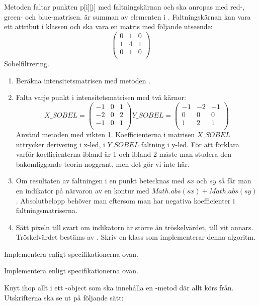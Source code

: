 Metoden faltar punkten p[i][j] med faltningskärnan  och ska anropas med red-, green- och blue-matrisen.  är summan av elementen i . Faltningskärnan kan vara ett attribut i klassen och ska vara en matris med följande utseende:
$$
\begin{pmatrix}
  0 & 1 & 0 \\
  1 & 4 & 1 \\
  0 & 1 & 0 \\
\end{pmatrix}
$$
\Task Sobelfiltrering.
\begin{enumerate} 
	\item Beräkna intensitetsmatrisen med metoden .
	\item Falta varje punkt i intensitetsmatrisen med två kärnor:
$$
X\_SOBEL =
\begin{pmatrix}
  -1 & 0 & 1 \\
  -2 & 0 & 2 \\
  -1 & 0 & 1 \\
\end{pmatrix}
Y\_SOBEL =
\begin{pmatrix}
  -1 & -2 & -1 \\
  0 & 0 & 0 \\
  1 & 2 & 1 \\
\end{pmatrix}
$$
	Använd metoden  med vikten 1. Koefficienterna i matrisen $X\_SOBEL$ uttrycker derivering i x-led, i $Y\_SOBEL$ faltning i y-led. För att förklara varför koefficienterna ibland är 1 och ibland 2 måste man studera den bakomliggande teorin noggrant, men det gör vi inte här.
	\item Om resultaten av faltningen i en punkt betecknas med $sx$ och $sy$ så får man en indikator på närvaron av en kontur med $Math.abs(sx) + Math.abs(sy)$. Absolutbelopp behöver man eftersom man har negativa koefficienter i faltningsmatriserna. 
	\item  Sätt pixeln till svart om indikatorn är större än tröskelvärdet, till vit annars. Tröskelvärdet bestäms av . Skriv en klass  som implementerar denna algoritm.
\end{enumerate}

\Task Implementera  enligt specifikationerna ovan.

\Task Implementera  enligt specifikationerna ovan.

\Task Knyt ihop allt i ett -object som ska innehålla en -metod där allt körs från. Utskrifterna ska se ut på följande sätt:

